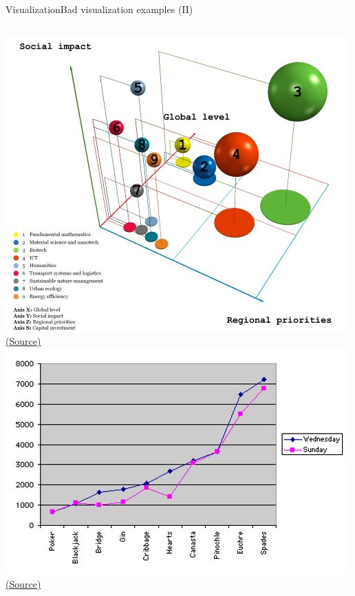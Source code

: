 \documentclass[10pt,compress]{beamer} %
\begin{document}
\begin{frame}{Visualization}{Bad visualization examples (II)}
	\begin{columns}
		\centering \includegraphics[width=\textwidth]{figs/bad4.jpg}\\
		\centering \tiny \href{http://livingqlikview.com/the-9-worst-data-visualizations-ever-created/}{(Source)}
		\centering \includegraphics[width=\textwidth]{figs/bad5.jpg}\\
		\centering \tiny \href{http://livingqlikview.com/the-9-worst-data-visualizations-ever-created/}{(Source)}
	\end{columns}
\end{frame}
\end{document}
